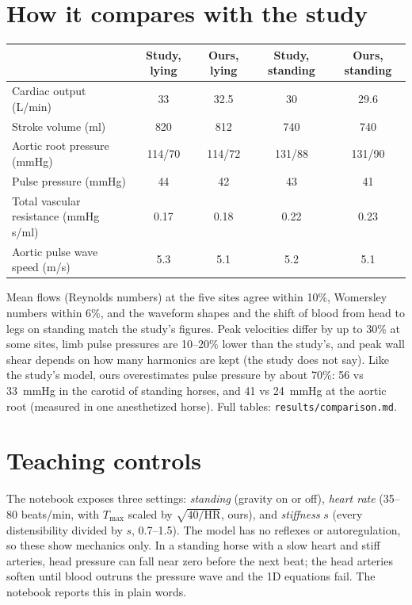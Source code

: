 \documentclass[10pt]{article}
\begin{document}
\section{How it compares with the study}
\begin{center}
\small
\begin{tabular}{@{}lcccc@{}}
\toprule
 & Study, lying & Ours, lying & Study, standing & Ours, standing \\
\midrule
Cardiac output (L/min) & 33 & 32.5 & 30 & 29.6 \\
Stroke volume (ml) & 820 & 812 & 740 & 740 \\
Aortic root pressure (mmHg) & 114/70 & 114/72 & 131/88 & 131/90 \\
Pulse pressure (mmHg) & 44 & 42 & 43 & 41 \\
Total vascular resistance (mmHg\,s/ml) & 0.17 & 0.18 & 0.22 & 0.23 \\
Aortic pulse wave speed (m/s) & 5.3 & 5.1 & 5.2 & 5.1 \\
\bottomrule
\end{tabular}
\end{center}
Mean flows (Reynolds numbers) at the five sites agree within 10\%, Womersley numbers within 6\%, and the waveform
shapes and the shift of blood from head to legs on standing match the study's figures. Peak velocities differ by up to
30\% at some sites, limb pulse pressures are 10--20\% lower than the study's, and peak wall shear depends on how many
harmonics are kept (the study does not say). Like the study's model, ours overestimates pulse pressure by about
70\%: 56 vs 33~mmHg in the carotid of standing horses, and 41 vs 24~mmHg at the aortic root (measured in one
anesthetized horse). Full tables: \texttt{results/comparison.md}.

\section{Teaching controls}
The notebook exposes three settings: \emph{standing} (gravity on or off), \emph{heart rate} (35--80 beats/min, with
$T_{\max}$ scaled by $\sqrt{40/\mathrm{HR}}$, ours), and \emph{stiffness} $s$ (every distensibility divided by $s$,
0.7--1.5). The model has no reflexes or autoregulation, so these show mechanics only. In a standing horse with a slow
heart and stiff arteries, head pressure can fall near zero before the next beat; the head arteries soften until blood
outruns the pressure wave and the 1D equations fail. The notebook reports this in plain words.
\end{document}

